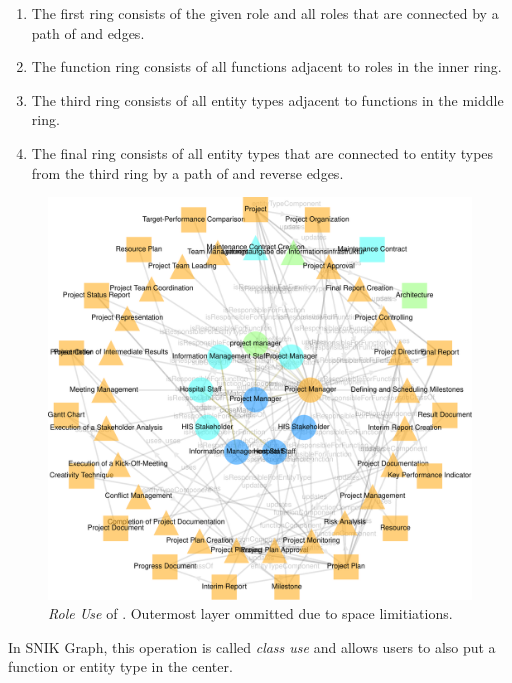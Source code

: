 \documentclass[conference]{IEEEtran}
\begin{document}
\begin{enumerate}%
\item The first ring consists of the given role and all roles that are connected by a path of  and  edges.
\item The function ring consists of all functions adjacent to roles in the inner ring.
\item The third ring consists of all entity types adjacent to functions in the middle ring.
\item The final ring consists of all entity types that are connected to entity types from the third ring by a path of  and reverse  edges.
\end{enumerate}
\begin{figure}[h!]
    \centering
    \includegraphics[width=\columnwidth]{img/class-use-project-manager.pdf}
    \caption{\emph{Role Use} of . Outermost layer ommitted due to space limitiations.}\label{fig:classuse}
\end{figure}
In SNIK Graph, this operation is called \emph{class use} and allows users to also put a function or entity type in the center.

\end{document}
